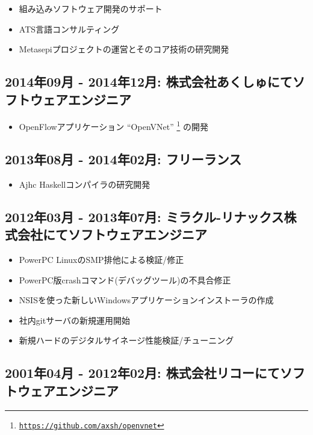 \documentclass[letterpaper]{article}
\begin{document}
\begin{itemize}
  \item 組み込みソフトウェア開発のサポート
  \item ATS言語コンサルティング
  \item Metasepiプロジェクトの運営とそのコア技術の研究開発
\end{itemize}

\subsection*{2014年09月 - 2014年12月: 株式会社あくしゅにてソフトウェアエンジニア}

\begin{itemize}
  \item OpenFlowアプリケーション ``OpenVNet'' \footnote{\href{https://github.com/axsh/openvnet}{\tt https://github.com/axsh/openvnet}} の開発
\end{itemize}

\subsection*{2013年08月 - 2014年02月: フリーランス}

\begin{itemize}
  \item Ajhc Haskellコンパイラの研究開発
\end{itemize}

\subsection*{2012年03月 - 2013年07月: ミラクル-リナックス株式会社にてソフトウェアエンジニア}

\begin{itemize}
  \item PowerPC LinuxのSMP排他による検証/修正
  \item PowerPC版crashコマンド(デバッグツール)の不具合修正
  \item NSISを使った新しいWindowsアプリケーションインストーラの作成
  \item 社内gitサーバの新規運用開始
  \item 新規ハードのデジタルサイネージ性能検証/チューニング
\end{itemize}

\subsection*{2001年04月 - 2012年02月: 株式会社リコーにてソフトウェアエンジニア}
\end{document}
